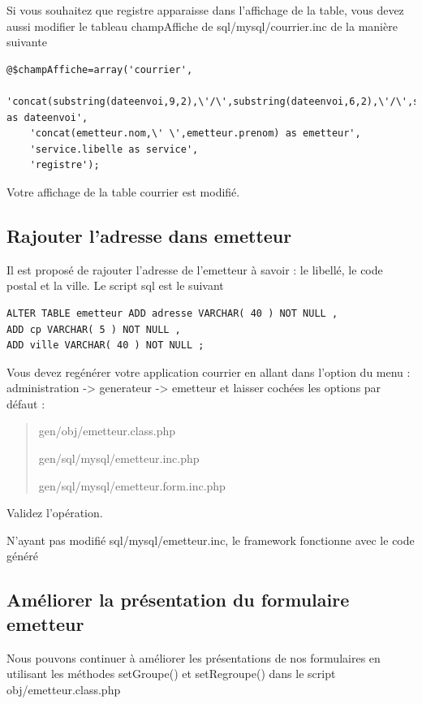 \documentclass[letterpaper,10pt,french]{manual}
\begin{document}
Si vous souhaitez que registre apparaisse dans l'affichage de la table, vous
devez aussi modifier le tableau champAffiche de sql/mysql/courrier.inc de la manière
suivante

\begin{Verbatim}[commandchars=@\[\]]
@$champAffiche=array('courrier',
    'concat(substring(dateenvoi,9,2),\'/\',substring(dateenvoi,6,2),\'/\',substring(dateenvoi,1,4)) as dateenvoi',
    'concat(emetteur.nom,\' \',emetteur.prenom) as emetteur',
    'service.libelle as service',
    'registre');
\end{Verbatim}

Votre affichage de la table courrier est modifié.


\subsection{Rajouter l'adresse dans emetteur}

Il est proposé de rajouter l'adresse de l'emetteur à savoir : le libellé, le code postal et
la ville. Le script sql est le suivant

\begin{Verbatim}[commandchars=@\[\]]
ALTER TABLE emetteur ADD adresse VARCHAR( 40 ) NOT NULL ,
ADD cp VARCHAR( 5 ) NOT NULL ,
ADD ville VARCHAR( 40 ) NOT NULL ;
\end{Verbatim}

Vous devez regénérer votre application courrier en allant dans l'option du menu :
administration -\textgreater{} generateur -\textgreater{} emetteur et laisser cochées les options par défaut :
\begin{quote}

gen/obj/emetteur.class.php

gen/sql/mysql/emetteur.inc.php

gen/sql/mysql/emetteur.form.inc.php
\end{quote}

Validez l'opération.

N'ayant pas modifié sql/mysql/emetteur.inc, le framework fonctionne avec le code généré


\subsection{Améliorer la présentation du formulaire emetteur}

Nous pouvons continuer à améliorer les présentations de nos formulaires
en utilisant les méthodes setGroupe() et setRegroupe() dans le script
obj/emetteur.class.php
\end{document}
